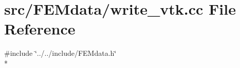 \section{src/\-F\-E\-Mdata/write\-\_\-vtk.cc File Reference}
\label{write__vtk_8cc}
{\ttfamily \#include \char`\"{}../../include/\-F\-E\-Mdata.\-h\char`\"{}}\\*
